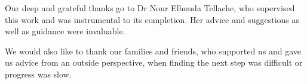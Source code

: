 \documentclass{mimosis}
\begin{document}
Our deep and grateful thanks go to Dr Nour Elhouda Tellache, who supervised this work and was instrumental to its completion. Her advice and suggestions as well as guidance were invaluable.

We would also like to thank our families and friends, who supported us and gave us advice from an outside perspective, when finding the next step was difficult or progress was slow.



\end{document}
